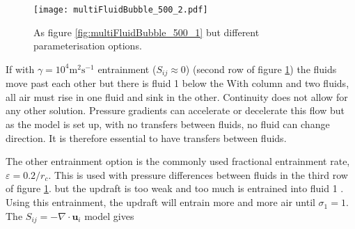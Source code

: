 \documentclass[draft]{agujournal2019}
\begin{document}
\begin{figure}
\noindent
\texttt{[image: multiFluidBubble\_500\_2.pdf]}
\caption{As figure \ref{fig:multiFluidBubble_500_1} but different parameterisation options.
\label{fig:multiFluidBubble_500_2}}
\end{figure}

If
with $\gamma=10^{4}\text{m}^{2}\text{s}^{-1}$
entrainment ($S_{ij}\approx 0$) (second row of figure \ref{fig:multiFluidBubble_500_2})
the fluids move past each other but there is 
fluid 1 below the 
With  column and
two fluids, all air must rise in one fluid and sink in the other.
Continuity does not allow for any other solution. Pressure gradients
can accelerate or decelerate this flow but as the model is set up,
with no transfers between fluids, no fluid can change direction. It
is therefore essential to have transfers between fluids.

The other entrainment option is the commonly used fractional entrainment
rate, $\varepsilon=0.2/r_{c}$. This is used  with pressure differences between fluids in the third row of figure \ref{fig:multiFluidBubble_500_2}.
but the  updraft is too
weak and too much is entrained into fluid 1 .
Using this entrainment, the updraft will entrain more and more air until $\sigma_{1}=1$. The $S_{ij}=-\nabla\cdot\mathbf{u}_{i}$ model gives
\end{document}
